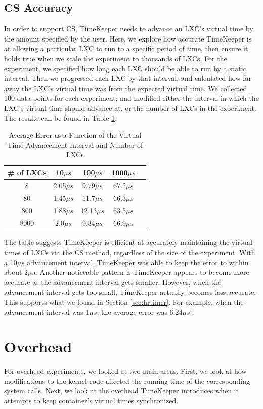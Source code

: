 \subsection{CS Accuracy}
In order to support CS, TimeKeeper needs to advance an LXC's virtual time by the amount specified by the user. Here, we explore how accurate TimeKeeper is at allowing a particular LXC to run to a specific period of time, then ensure it holds true when we scale the experiment to thousands of LXCs. For the experiment, we specified how long each LXC should be able to run by a static interval. Then we progressed each LXC by that interval, and calculated how far away the LXC's virtual time was from the expected virtual time. We collected 100 data points for each experiment, and modified either the interval in which the LXC's virtual time should advance at, or the number of LXCs in the experiment. The results can be found in Table \ref{table:cs_accuracy}.
\begin{table}\centering 
\begin{tabular}{|c|c|c|c|c|} 
        \hline 
       \# of LXCs & 10$\mu s$ & 100$\mu s$  & 1000$\mu s$  \\ \hline 
        8 & 2.05$\mu s$ & 9.79$\mu s$ & 67.2$\mu s$ \\ \hline 
        80 & 1.45$\mu s$ & 11.7$\mu s$ & 66.3$\mu s$ \\ \hline 
        800 & 1.88$\mu s$ & 12.13$\mu s$ & 63.5$\mu s$ \\ \hline 
        8000 & 2.0$\mu s$ & 9.34$\mu s$ & 66.9$\mu s$ \\ \hline 
        \hline 
        \end{tabular} 
        \caption{Average Error as a Function of the Virtual Time Advancement Interval and Number of LXCs} 
        \label{table:cs_accuracy}
\end{table}
The table suggests TimeKeeper is efficient at accurately maintaining the virtual times of LXCs via the CS method, regardless of the size of the experiment. With a 10$\mu s$ advancement interval, TimeKeeper was able to keep the error to within about 2$\mu s$. Another noticeable pattern is TimeKeeper appears to become more accurate as the advancement interval gets smaller. However, when the advancement interval gets too small, TimeKeeper actually becomes less accurate. This supports what we found in Section \ref{sec:hrtimer}. For example, when the advancement interval was 1$\mu s$, the average error was 6.24$\mu s$! 

\section{Overhead}
\label{sec:over}
For overhead experiments, we looked at two main areas. First, we look at how modifications to the kernel code affected the running time of the corresponding system calls. Next, we look at the overhead TimeKeeper introduces when it attempts to keep container's virtual times synchronized.
